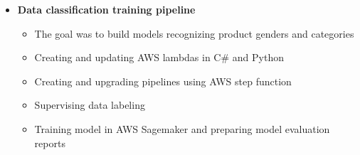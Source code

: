 \documentclass[10pt,a4paper,ragged2e,withhyper, normalphoto]{altacv}
\begin{document}
\begin{paracol}{2}
\begin{itemize}
        
    
    \end{itemize}
    
    \divider

    
    \begin{itemize}
        \item \textbf{\textcolor{DarkPastelRed}{Data classification training pipeline}}
        \begin{itemize}
            \item The goal was to build models recognizing product genders and categories
            \item Creating and updating AWS lambdas in C\# and Python
            \item Creating and upgrading pipelines using AWS step function
            \item Supervising data labeling
            \item Training model in AWS Sagemaker and preparing model evaluation reports
        \end{itemize}


\end{itemize}
\end{paracol}
\end{document}
